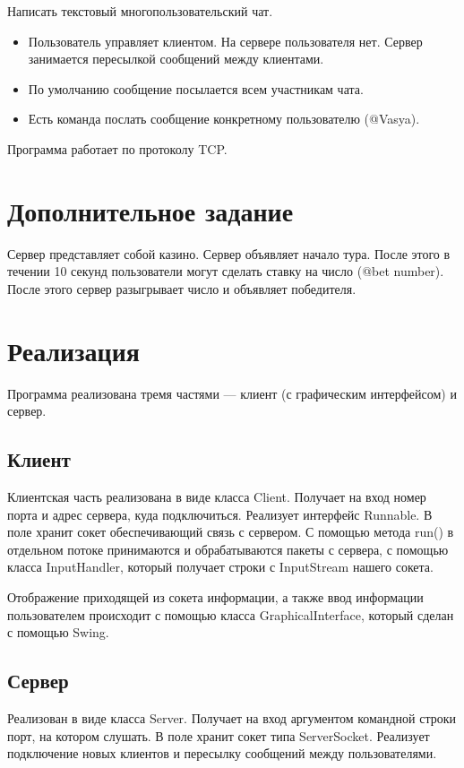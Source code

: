 \documentclass{article}
\begin{document}
Написать текстовый многопользовательский чат.

\begin{itemize}
	\item Пользователь управляет клиентом. На сервере пользователя нет. Сервер занимается пересылкой сообщений между клиентами.

	\item По умолчанию сообщение посылается всем участникам чата.

	\item Есть команда послать сообщение конкретному пользователю (@Vasya).
\end{itemize}

Программа работает по протоколу TCP.

\section{Дополнительное задание}
Сервер представляет собой казино. Сервер объявляет начало тура. После этого в течении 10 секунд пользователи могут сделать ставку на число (@bet number). После этого сервер разыгрывает число и объявляет победителя.

\section{Реализация}
Программа реализована тремя частями --- клиент (с графическим интерфейсом) и сервер.

\subsection{Клиент}
Клиентская часть реализована в виде класса Client. Получает на вход номер порта и адрес сервера, куда подключиться. Реализует интерфейс Runnable. В поле хранит сокет обеспечивающий связь с сервером. С помощью метода run() в отдельном потоке принимаются и обрабатываются пакеты с сервера, с помощью класса InputHandler, который получает строки с InputStream нашего сокета. 

Отображение приходящей из сокета информации, а также ввод информации пользователем происходит с помощью класса GraphicalInterface, который сделан с помощью Swing.

\subsection{Сервер}
Реализован в виде класса Server. Получает на вход аргументом командной строки порт, на котором слушать. В поле хранит сокет типа ServerSocket. Реализует подключение новых клиентов и пересылку сообщений между пользователями.
\end{document}
